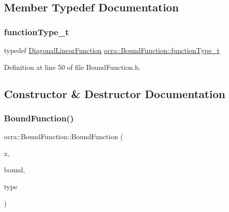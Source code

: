 \subsection{Member Typedef Documentation}
\hypertarget{classocra_1_1BoundFunction_acba2ac4d2f6caf04054590615a41ac21}{}\label{classocra_1_1BoundFunction_acba2ac4d2f6caf04054590615a41ac21} 
\subsubsection{\texorpdfstring{function\+Type\+\_\+t}{functionType\_t}}
{\footnotesize\ttfamily typedef \hyperlink{classocra_1_1DiagonalLinearFunction}{Diagonal\+Linear\+Function} \hyperlink{classocra_1_1BoundFunction_acba2ac4d2f6caf04054590615a41ac21}{ocra\+::\+Bound\+Function\+::function\+Type\+\_\+t}}



Definition at line 50 of file Bound\+Function.\+h.



\subsection{Constructor \& Destructor Documentation}
\hypertarget{classocra_1_1BoundFunction_a7dc079453fdb607b46295246153481fd}{}\label{classocra_1_1BoundFunction_a7dc079453fdb607b46295246153481fd} 
\subsubsection{\texorpdfstring{Bound\+Function()}{BoundFunction()}\hspace{0.1cm}{\footnotesize\ttfamily [1/2]}}
{\footnotesize\ttfamily ocra\+::\+Bound\+Function\+::\+Bound\+Function (\begin{DoxyParamCaption}\item[{\hyperlink{classocra_1_1Variable}{Variable} \&}]{x,  }\item[{const Vector\+Xd \&}]{bound,  }\item[{\hyperlink{namespaceocra_ab3efdc117d9e5bcb0192640f5e7dc79b}{e\+Bound\+Type}}]{type }\end{DoxyParamCaption})}

